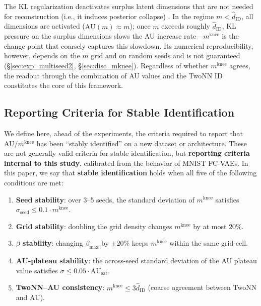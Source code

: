 \documentclass[make,article,submit,pdftex,moreauthors]{Definitions/mdpi}
\newcommand{\AUsat}{\mathrm{AU}_{\mathrm{sat}}}
\newcommand{\mknee}{m^{\mathrm{knee}}}
\begin{document}
The KL regularization deactivates surplus latent dimensions that are not needed
for reconstruction (i.e., it induces posterior collapse)
\cite{lucas2019elbo,higgins2017betavae}.
In the regime $m < \hat{d}_\mathrm{ID}$, all dimensions are activated
($\mathrm{AU}(m) \approx m$); once $m$ exceeds roughly $\hat{d}_\mathrm{ID}$,
KL pressure on the surplus dimensions slows the AU increase rate---$\mknee$ is
the change point that coarsely captures this slowdown.
Its numerical reproducibility, however, depends on the $m$ grid and on random
seeds and is not guaranteed (§\ref{sec:exp_multiseed2}, §\ref{sec:disc_mknee}).
Regardless of whether $\mknee$ agrees, the readout through the combination of AU
values and the TwoNN ID constitutes the core of this framework.

\subsection{Reporting Criteria for Stable Identification}\label{sec:natimg_stable_id}

We define here, ahead of the experiments, the criteria required to report that
AU/$\mknee$ has been ``stably identified'' on a new dataset or architecture.
These are not generally valid criteria for stable identification, but
\textbf{reporting criteria internal to this study}, calibrated from the behavior
of MNIST FC-VAEs.
In this paper, we say that \textbf{stable identification} holds when all five of
the following conditions are met:

\begin{enumerate}
  \item \textbf{Seed stability}: over 3--5 seeds, the standard deviation of
        $\mknee$ satisfies $\sigma_\mathrm{seed} \leq 0.1 \cdot \mknee$.
  \item \textbf{Grid stability}: doubling the grid density changes $\mknee$ by
        at most $20\%$.
  \item \textbf{$\beta$ stability}: changing $\beta_{\max}$ by $\pm 20\%$ keeps
        $\mknee$ within the same grid cell.
  \item \textbf{AU-plateau stability}: the across-seed standard deviation of the AU
        plateau value satisfies $\sigma \leq 0.05 \cdot \AUsat$.
  \item \textbf{TwoNN--AU consistency}: $\mknee \leq 3 \hat{d}_\mathrm{ID}$
        (coarse agreement between TwoNN and AU).
\end{enumerate}
\end{document}
